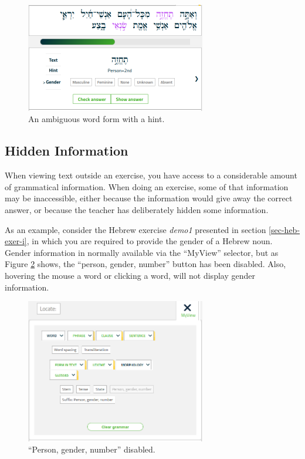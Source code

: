 \documentclass[11pt,oneside,a4paper]{memoir}
\begin{document}
\begin{figure}
  \begin{center}
    \includegraphics[width=0.7\textwidth]{fig-ambig.png}
  \end{center}
  \caption{An ambiguous word form with a hint.}\label{fig-ambig}
\end{figure}


\subsection{Hidden Information}

When viewing text outside an exercise, you have access to a considerable amount of grammatical
information. When doing an exercise, some of that information may be inaccessible, either because
the information would give away the correct answer, or because the teacher has deliberately hidden
some information.

As an example, consider the Hebrew exercise \emph{demo1} presented in section \ref{sec-heb-exer-i}, in
which you are required to provide the gender of a Hebrew noun. Gender information in normally
available via the ``MyView'' selector, but as Figure \ref{fig-no-gender} shows, the ``person,
gender, number'' button has been disabled. Also, hovering the mouse a word or clicking a word, will
not display gender information.

\begin{figure}
  \begin{center}
    \includegraphics[width=0.7\textwidth]{fig-no-gender.png}
  \end{center}
  \caption{``Person, gender, number'' disabled.}\label{fig-no-gender}
\end{figure}
\end{document}
